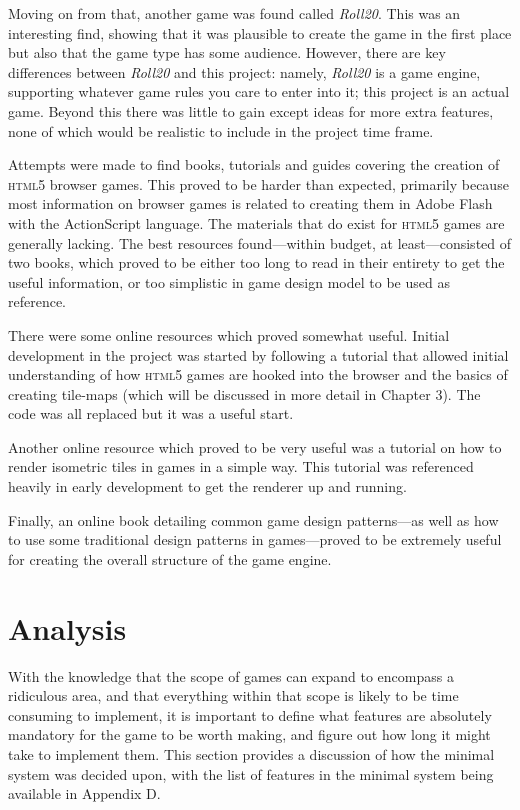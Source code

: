 Moving on from that, another game was found called \textit{Roll20}\cite{citeulike:13141206}. This was an interesting find, showing that it was plausible to create the game in the first place but also that the game type has some audience. However, there are key differences between \textit{Roll20} and this project: namely, \textit{Roll20} is a game engine, supporting whatever game rules you care to enter into it; this project is an actual game. Beyond this there was little to gain except ideas for more extra features, none of which would be realistic to include in the project time frame.

Attempts were made to find books, tutorials and guides covering the creation of \textsc{html5} browser games. This proved to be harder than expected, primarily because most information on browser games is related to creating them in Adobe Flash with the ActionScript language. The materials that do exist for \textsc{html5} games are generally lacking. The best resources found---within budget, at least---consisted of two books\cite{citeulike:13000145, citeulike:13000170}, which proved to be either too long to read in their entirety to get the useful information, or too simplistic in game design model to be used as reference.

There were some online resources which proved somewhat useful. Initial development in the project was started by following a tutorial\cite{citeulike:13139212} that allowed initial understanding of how \textsc{html5} games are hooked into the browser and the basics of creating tile-maps (which will be discussed in more detail in Chapter 3). The code was all replaced but it was a useful start.

Another online resource which proved to be very useful was a tutorial on how to render isometric tiles in games in a simple way\cite{citeulike:13139216}. This tutorial was referenced heavily in early development to get the renderer up and running.

Finally, an online book detailing common game design patterns\cite{citeulike:13049596}---as well as how to use some traditional design patterns in games---proved to be extremely useful for creating the overall structure of the game engine.


\section{Analysis}
With the knowledge that the scope of games can expand to encompass a ridiculous area, and that everything within that scope is likely to be time consuming to implement, it is important to define what features are absolutely mandatory for the game to be worth making, and figure out how long it might take to implement them. This section provides a discussion of how the minimal system was decided upon, with the list of features in the minimal system being available in Appendix D.

